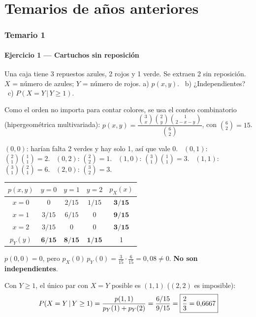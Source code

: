 \newpage
\part{Temarios de años anteriores}
\section{Temario 1}

\subsection{Ejercicio 1 --- Cartuchos sin reposición}
\begin{enun}
Una caja tiene 3 repuestos azules, 2 rojos y 1 verde. Se extraen 2 sin reposición. $X$ = número de azules; $Y$ = número de rojos.
a) $p(x,y)$. \ b) ¿Independientes? \ c) $P(X=Y\,|\,Y\ge1)$.
\end{enun}
\begin{metodo}
Como el orden no importa para contar colores, se usa el conteo combinatorio (hipergeométrica multivariada):
$p(x,y)=\dfrac{\binom3x\binom2y\binom1{2-x-y}}{\binom62}$, con $\binom62=15$.
\end{metodo}
$(0,0)$: harían falta 2 verdes y hay solo 1, así que vale 0. \ $(0,1)$: $\binom21\binom11=2$. \ $(0,2)$: $\binom22=1$. \ $(1,0)$: $\binom31\binom11=3$. \ $(1,1)$: $\binom31\binom21=6$. \ $(2,0)$: $\binom32=3$.
\begin{center}
\renewcommand{\arraystretch}{1.3}
\begin{tabular}{@{}c|ccc|c@{}}
\toprule
$p(x,y)$ & $y=0$ & $y=1$ & $y=2$ & $p_X(x)$\\\midrule
$x=0$ & 0 & $2/15$ & $1/15$ & $\mathbf{3/15}$\\
$x=1$ & $3/15$ & $6/15$ & 0 & $\mathbf{9/15}$\\
$x=2$ & $3/15$ & 0 & 0 & $\mathbf{3/15}$\\\midrule
$p_Y(y)$ & $\mathbf{6/15}$ & $\mathbf{8/15}$ & $\mathbf{1/15}$ & 1\\\bottomrule
\end{tabular}
\end{center}
$p(0,0)=0$, pero $p_X(0)\,p_Y(0)=\frac3{15}\cdot\frac6{15}=0{,}08\neq0$. \textbf{No son independientes}.

Con $Y\ge1$, el único par con $X=Y$ posible es $(1,1)$ ($(2,2)$ es imposible):
\[
P(X=Y\,|\,Y\ge1)=\frac{p(1,1)}{p_Y(1)+p_Y(2)}=\frac{6/15}{9/15}=\boxed{\frac23=0{,}6667}
\]


